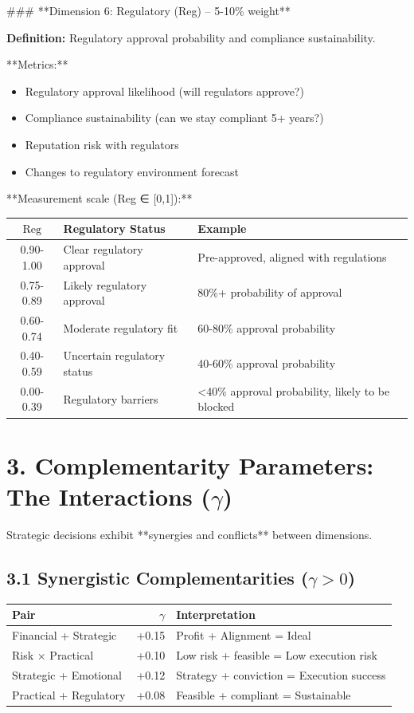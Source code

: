 \documentclass[11pt]{article}
\begin{document}
### **Dimension 6: Regulatory (Reg) – 5-10\% weight**

\textbf{Definition:} Regulatory approval probability and compliance sustainability.

**Metrics:**
\begin{itemize}
\item Regulatory approval likelihood (will regulators approve?)
\item Compliance sustainability (can we stay compliant 5+ years?)
\item Reputation risk with regulators
\item Changes to regulatory environment forecast
\end{itemize}

**Measurement scale (Reg ∈ [0,1]):**
\begin{table}[h]
\centering
\begin{tabular}{|c|l|l|}
\hline
$\text{Reg}$ & \textbf{Regulatory Status} & \textbf{Example} \\
\hline
0.90-1.00 & Clear regulatory approval & Pre-approved, aligned with regulations \\
0.75-0.89 & Likely regulatory approval & 80\%+ probability of approval \\
0.60-0.74 & Moderate regulatory fit & 60-80\% approval probability \\
0.40-0.59 & Uncertain regulatory status & 40-60\% approval probability \\
0.00-0.39 & Regulatory barriers & <40\% approval probability, likely to be blocked \\
\hline
\end{tabular}
\end{table}

\section{3. Complementarity Parameters: The Interactions ($\gamma$)}

Strategic decisions exhibit **synergies and conflicts** between dimensions.

\subsection{3.1 Synergistic Complementarities ($\gamma > 0$)}

\begin{table}[h]
\centering
\begin{tabular}{|l|r|l|}
\hline
\textbf{Pair} & $\gamma$ & \textbf{Interpretation} \\
\hline
Financial + Strategic & +0.15 & Profit + Alignment = Ideal \\
Risk $\times$ Practical & +0.10 & Low risk + feasible = Low execution risk \\
Strategic + Emotional & +0.12 & Strategy + conviction = Execution success \\
Practical + Regulatory & +0.08 & Feasible + compliant = Sustainable \\
\hline
\end{tabular}
\end{table}
\end{document}
